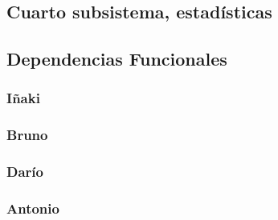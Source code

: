 \documentclass[a4paper, 11pt]{article}
\begin{document}
\subsection{Cuarto subsistema, estadísticas}




\newpage
\subsection{Dependencias Funcionales}
\begin{itemize}
	\subsubsection{Iñaki}

\subsubsection{Bruno}

\subsubsection{Darío}

\subsubsection{Antonio}

\end{itemize}
\end{document}
